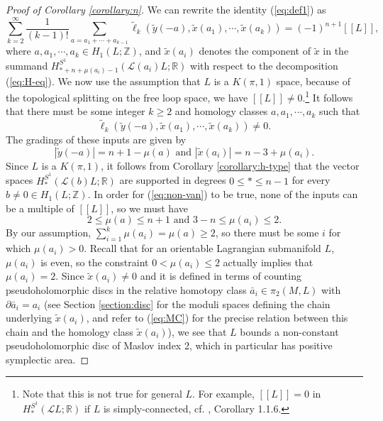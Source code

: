\documentclass[a4paper]{article}
\numberwithin{equation}{section}
\begin{document}
\begin{proof}[Proof of Corollary \ref{corollary:n}]
We can rewrite the identity (\ref{eq:def1}) as
\begin{equation}
\sum_{k=2}^\infty\frac{1}{(k-1)!}\sum_{a=a_1+\cdots+a_{k-1}}\tilde{\ell}_k\left(\tilde{y}(-a),\tilde{x}(a_1),\cdots,\tilde{x}(a_k)\right)=(-1)^{n+1}[\![L]\!],
\end{equation}
where $a,a_1,\cdots,a_k\in H_1(L;\mathbb{Z})$, and $\tilde{x}(a_i)$ denotes the component of $\tilde{x}$ in the summand $H_{\ast+n+\mu(a_i)-1}^{S^1}(\mathcal{L}(a_i)L;\mathbb{R})$ with respect to the decomposition (\ref{eq:H-eq}). We now use the assumption that $L$ is a $K(\pi,1)$ space, because of the topological splitting on the free loop space, we have $[\![L]\!]\neq0$.\footnote{Note that this is not true for general $L$. For example, $[\![L]\!]=0$ in $H_\ast^{S^1}(\mathcal{L}L;\mathbb{R})$ if $L$ is simply-connected, cf. \cite{jz}, Corollary 1.1.6.} It follows that there must be some integer $k\geq2$ and homology classes $a,a_1,\cdots,a_k$ such that
\begin{equation}\label{eq:non-van} 
\tilde{\ell}_k\left(\tilde{y}(-a),\tilde{x}(a_1),\cdots,\tilde{x}(a_k)\right)\neq0.
\end{equation}
The gradings of these inputs are given by
\begin{equation}
|\tilde{y}(-a)|=n+1-\mu(a)\textrm{ and }|\tilde{x}(a_i)|=n-3+\mu(a_i).
\end{equation}
Since $L$ is a $K(\pi,1)$, it follows from Corollary \ref{corollary:h-type} that the vector spaces $H_\ast^{S^1}(\mathcal{L}(b)L;\mathbb{R})$ are supported in degrees $0\leq\ast\leq n-1$ for every $b\neq0\in H_1(L;\mathbb{Z})$. In order for (\ref{eq:non-van}) to be true, none of the inputs can be a multiple of $[\![L]\!]$, so we must have
\begin{equation}
2\leq\mu(a)\leq n+1\textrm{ and }3-n\leq\mu(a_i)\leq2.
\end{equation}
By our assumption, $\sum_{i=1}^k\mu(a_i)=\mu(a)\geq2$, so there must be some $i$ for which $\mu(a_i)>0$. Recall that for an orientable Lagrangian submanifold $L$, $\mu(a_i)$ is even, so the constraint $0<\mu(a_i)\leq2$ actually implies that $\mu(a_i)=2$. Since $\tilde{x}(a_i)\neq0$ and it is defined in terms of counting pseudoholomorphic discs in the relative homotopy class $\bar{a}_i\in\pi_2(M,L)$ with $\partial\bar{a}_i=a_i$ (see Section \ref{section:disc} for the moduli spaces defining the chain underlying $\tilde{x}(a_i)$, and refer to (\ref{eq:MC}) for the precise relation between this chain and the homology class $\tilde{x}(a_i)$), we see that $L$ bounds a non-constant pseudoholomorphic disc of Maslov index 2, which in particular has positive symplectic area.


\end{proof}
\end{document}
